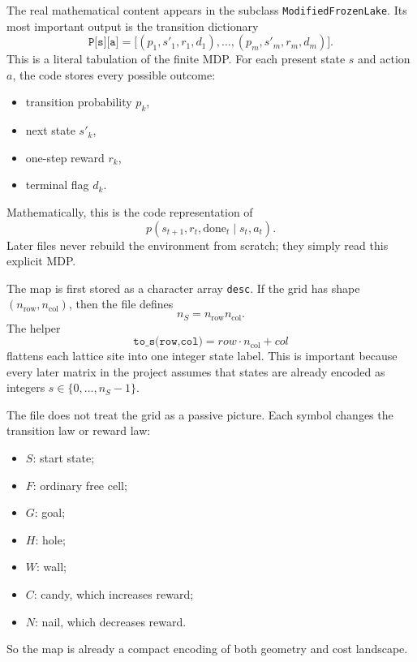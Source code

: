\documentclass[11pt]{article}
\begin{document}
The real mathematical content appears in the subclass \texttt{ModifiedFrozenLake}. Its most
important output is the transition dictionary
\begin{equation}
    \texttt{P[s][a]} = \bigl[(p_1,s'_1,r_1,d_1),\dots,(p_m,s'_m,r_m,d_m)\bigr].
\end{equation}
This is a literal tabulation of the finite MDP. For each present state \(s\) and action
\(a\), the code stores every possible outcome:
\begin{itemize}
    \item transition probability \(p_k\),
    \item next state \(s'_k\),
    \item one-step reward \(r_k\),
    \item terminal flag \(d_k\).
\end{itemize}

Mathematically, this is the code representation of
\begin{equation}
    p(s_{t+1},r_t,\mathrm{done}_t \mid s_t,a_t).
\end{equation}
Later files never rebuild the environment from scratch; they simply read this explicit MDP.

The map is first stored as a character array \texttt{desc}. If the grid has shape
\((n_{\mathrm{row}},n_{\mathrm{col}})\), then the file defines
\begin{equation}
    n_S = n_{\mathrm{row}}n_{\mathrm{col}}.
\end{equation}
The helper
\begin{equation}
    \texttt{to\_s(row,col)} = row \cdot n_{\mathrm{col}} + col
\end{equation}
flattens each lattice site into one integer state label. This is important because every
later matrix in the project assumes that states are already encoded as integers
\(s \in \{0,\dots,n_S-1\}\).

The file does not treat the grid as a passive picture. Each symbol changes the transition law
or reward law:
\begin{itemize}
    \item \(S\): start state;
    \item \(F\): ordinary free cell;
    \item \(G\): goal;
    \item \(H\): hole;
    \item \(W\): wall;
    \item \(C\): candy, which increases reward;
    \item \(N\): nail, which decreases reward.
\end{itemize}
So the map is already a compact encoding of both geometry and cost landscape.
\end{document}
